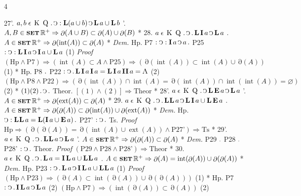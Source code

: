 \documentclass{book}
\newcommand{\s}{\switchcolumn} %
\newcommand{\C}{\mathop{\sbox0{$\displaystyle$$\reflectbox{C}$} %
\raisebox{-\height+\ht0-0.05cm}[\ht0][\dp0]{\scalebox{0.8}[0.8]{\copy0}}}\displaylimits} %
\newcommand{\p}{\mathop{\sbox0{$\displaystyle$$.$}
\raisebox{-\height+\ht0}[\ht0][\dp0]{\scalebox{1}[1]{\copy0}}}\displaylimits} %
\newcommand{\abs}{\mathop{\rotatebox[origin=c]{180}{V}}}
\newcommand{\smallIn}{\ensuremath{\mathrel{\epsilon}}}
\newcommand{\I}{\mathop{\textbf{I}}}
\newcommand{\E}{\mathop{\textbf{E}}}
\newcommand{\Lfat}{\mathop{\textbf{L}}}
\newcommand{\K}{\mathop{\thinspace \text{K} \thinspace}}
\newcommand{\Q}{\mathop{\thinspace \text{Q} \thinspace}}
\newcommand{\II}{\mathop{\textbf{I\hspace{0.02cm}I}}}
\newcommand{\LfatLfat}{\mathop{\textbf{L\hspace{0.02cm}L}}}
\newcommand{\setOfSets}{\mathop{\text{{\footnotesize \textbf{SET}}}}}
\renewcommand{\rightarrow}{\Rightarrow}
\DeclareMathOperator{\interior}{int}
\DeclareMathOperator{\exterior}{ext}
\DeclareMathOperator{\boundary}{\partial}
\newenvironment{translateFourCol}[4]
               { %
                 \setcolumnwidth{#1\fill/1em, #2\fill/\columnsep, #3\fill/1em, #4\fill}
                 \begin{paracol}{4}
                 \newcommand{\LAT}{\switchcolumn[0]*}
                 \newcommand{\ENG}{\switchcolumn[2]}
               }
               { %
                 \let\ENG\undefined
                 \let\LAT\undefined
                 \end{paracol}
               }
\begin{document}
\begin{translateFourCol}{0.08}{0.42}{0.08}{0.42}
\raggedright
27'. \s $a,b \smallIn \K \Q \p \C : \Lfat (a \cup b) \C \Lfat a \cup \Lfat b$
\ENG
27'. \s $A,B \in \setOfSets \mathbb{R}^+ \rightarrow \boundary(A \cup B) \subset \boundary(A) \cup \boundary(B)$
\LAT
28. \s $a \smallIn \K \Q \p \C \p \Lfat \I a \C \Lfat a$
\ENG
28. \s $A \in \setOfSets \mathbb{R}^+ \rightarrow \boundary(\interior(A)) \subset \boundary(A)$
\LAT
\emph{Dem.} \s Hp. P7 $: \C : \I a \C a \p$ P25 $: \C : \Lfat \I a \C \I a \cup \Lfat a$ \hfill (1)
\ENG
\emph{Proof} \s $(\text{Hp} \wedge \text{P7}) \rightarrow (\interior(A) \subset A \wedge \text{P25}) \rightarrow (\boundary(\interior(A)) \subset \interior(A) \cup \boundary(A))$ \hfill (1)
\LAT
\s Hp. P8 $\p$ P22 $: \C \p \Lfat \I a \I a = \Lfat \I a \II a = \abs$ \hfill (2)
\ENG
\s $(\text{Hp} \wedge \text{P8} \wedge \text{P22}) \rightarrow (\boundary(\interior(A)) \cap \interior(A) = \boundary(\interior(A)) \cap \interior(\interior(A)) = \varnothing)$ \hfill (2)
\LAT
\s $(1)(2) \p \C \p$ Theor.
\ENG
\s $[(1) \wedge (2)] \rightarrow \text{Theor}$
\LAT
28'. \s $a \smallIn \K \Q \p \C \Lfat \E a \C \Lfat a$
\ENG
28'. \s $A \in \setOfSets \mathbb{R}^+ \rightarrow \boundary(\exterior(A)) \subset \boundary(A)$
\LAT
29. \s $a \smallIn \K \Q \p \C \p \LfatLfat a \C \Lfat \I a \cup \Lfat \E a$
\ENG
29. \s $A \in \setOfSets \mathbb{R}^+ \rightarrow \boundary(\boundary(A)) \subset \boundary(\interior(A)) \cup \boundary(\exterior(A))$
\LAT
\emph{Dem.} \s Hp. $\C : \LfatLfat a = \Lfat (\I a \cup \E a) \p$ P27' $: \C \p$ Ts.
\ENG
\emph{Proof} \s $\text{Hp} \rightarrow (\boundary(\boundary(A)) = \boundary(\interior(A) \cup \exterior(A)) \wedge \text{P27'}) \rightarrow \text{Ts}$
\LAT
29'. \s $a \smallIn \K \Q \p \C \p \LfatLfat a \C \Lfat a$
\ENG
29'. \s $A \in \setOfSets \mathbb{R}^+ \rightarrow \boundary(\boundary(A)) \subset \boundary(A)$
\LAT
\emph{Dem.} \s P29 $\p$ P28 $\p$ P28' $: \C \p$ Theor.
\ENG
\emph{Proof} \s $(\text{P29} \wedge \text{P28} \wedge \text{P28'}) \rightarrow \text{Theor}$
\LAT
30. \s $a \smallIn \K \Q \p \C \p \Lfat a = \I\Lfat a \cup \LfatLfat a$
\ENG
30. \s $A \in \setOfSets \mathbb{R}^+ \rightarrow \boundary(A) = \interior(\boundary(A)) \cup \boundary(\boundary(A))$
\LAT
\emph{Dem.} \s Hp. P23 $: \C \p \Lfat a \C \I\Lfat a \cup \LfatLfat a$ \hfill (1)
\ENG
\emph{Proof} \s $(\text{Hp} \wedge \text{P23}) \rightarrow (\boundary(A) \subset \interior(\boundary(A)) \cup \boundary(\boundary(A)))$ \hfill (1)
\LAT
\s Hp. P7 $: \C \p \I \Lfat a \C \Lfat a$ \hfill (2)
\ENG
\s $(\text{Hp} \wedge \text{P7}) \rightarrow (\interior(\boundary(A)) \subset \boundary(A))$ \hfill (2)

\end{translateFourCol}
\end{document}
